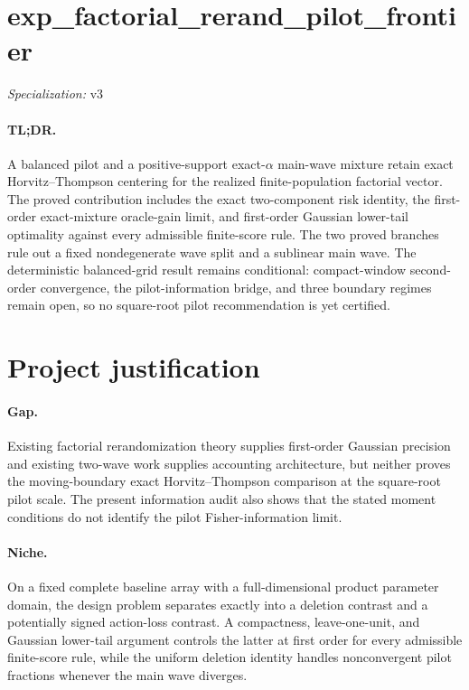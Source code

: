 \documentclass{article}
\begin{document}
\sloppy

\section*{exp\_\allowbreak{}factorial\_\allowbreak{}rerand\_\allowbreak{}pilot\_\allowbreak{}frontier}

\noindent\textit{Specialization:} v3\par

\paragraph{TL;DR.} A balanced pilot and a positive-support exact-\(\alpha\) main-wave mixture retain exact Horvitz--Thompson centering for the realized finite-population factorial vector. The proved contribution includes the exact two-component risk identity, the first-order exact-mixture oracle-gain limit, and first-order Gaussian lower-tail optimality against every admissible finite-score rule. The two proved branches rule out a fixed nondegenerate wave split and a sublinear main wave. The deterministic balanced-grid result remains conditional: compact-window second-order convergence, the pilot-information bridge, and three boundary regimes remain open, so no square-root pilot recommendation is yet certified.

\section{Project justification}

\paragraph{Gap.} Existing factorial rerandomization theory supplies first-order Gaussian precision and existing two-wave work supplies accounting architecture, but neither proves the moving-boundary exact Horvitz--Thompson comparison at the square-root pilot scale. The present information audit also shows that the stated moment conditions do not identify the pilot Fisher-information limit.

\paragraph{Niche.} On a fixed complete baseline array with a full-dimensional product parameter domain, the design problem separates exactly into a deletion contrast and a potentially signed action-loss contrast. A compactness, leave-one-unit, and Gaussian lower-tail argument controls the latter at first order for every admissible finite-score rule, while the uniform deletion identity handles nonconvergent pilot fractions whenever the main wave diverges.
\end{document}
